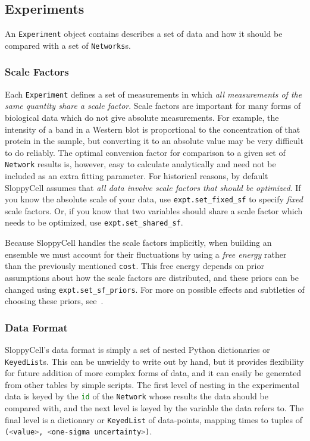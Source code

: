 \documentclass[12pt]{article}
\makeatletter
\newcommand{\py}[1]{\lstinline[language=Python, showstringspaces=False]@#1@}
\makeatother
\begin{document}
\subsection{Experiments}
An \py{Experiment} object contains describes a set of data and how it should be compared with a set of \py{Networks}s.

\subsubsection{Scale Factors\label{sec:user:sf}}
Each \py{Experiment} defines a set of measurements in which \emph{all measurements of the same quantity share a scale factor}.
Scale factors are important for many forms of biological data which do not give absolute measurements.
For example, the intensity of a band in a Western blot is proportional to the concentration of that protein in the sample, but converting it to an absolute value may be very difficult to do reliably.
The optimal conversion factor for comparison to a given set of \py{Network} results is, however, easy to calculate analytically and need not be included as an extra fitting parameter.
For historical reasons, by default SloppyCell assumes that \emph{all data involve scale factors that should be optimized}.
If you know the absolute scale of your data, use \py{expt.set_fixed_sf} to specify \emph{fixed} scale factors.
Or, if you know that two variables should share a scale factor which needs to be optimized, use \py{expt.set_shared_sf}.

Because SloppyCell handles the scale factors implicitly, when building an ensemble we must account for their fluctuations by using a \emph{free energy} rather than the previously mentioned \py{cost}.
This free energy depends on prior assumptions about how the scale factors are distributed, and these priors can be changed using \py{expt.set_sf_priors}.
For more on possible effects and subtleties of choosing these priors, see~\cite[Section 6.2]{bib:GutenkunstPhD}. %

\subsubsection{Data Format}

SloppyCell's data format is simply a set of nested Python dictionaries or \py{KeyedList}s.
This can be unwieldy to write out by hand, but it provides flexibility for future addition of more complex forms of data, and it can easily be generated from other tables by simple scripts.
The first level of nesting in the experimental data is keyed by the \py{id} of the \py{Network} whose results the data should be compared with, and the next level is keyed by the variable the data refers to.
The final level is a dictionary or \py{KeyedList} of data-points, mapping times to tuples of \py{(<value>, <one-sigma uncertainty>)}.
\end{document}
